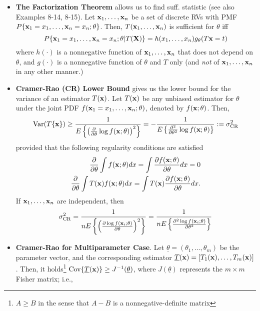 \documentclass[a4paper, oneside]{book}
\begin{document}
\begin{itemize}
\item \textbf{The Factorization Theorem} allows us to find suff. statistic (see also Examples 8-14, 8-15). Let $\mathbf{x}_1,\hdots,\mathbf{x}_n$ be a set of discrete RVs with PMF $P\{\mathbf{x}_1=x_1,\hdots,\mathbf{x}_n=x_n; \theta \}$. Then, $T(\mathbf{x}_1, \hdots, \mathbf{x}_n)$ is sufficient for $\theta$ iff 
\begin{equation}
P\{\mathbf{x}_1=x_1,\hdots,\mathbf{x}_n=x_n; \theta | T(\mathbf{X})\}=h(x_1,\dots,x_n)g_\theta(T\mathbf{x}=t)
\end{equation}	
where $h(\cdot)$ is a nonnegative function of $\mathbf{x}_1, \hdots, \mathbf{x}_n$ that does not depend on $\theta$, and $g(\cdot)$ is a nonnegative function of $\theta$ and $T$ only (and \textit{not} of $\mathbf{x}_1, \hdots, \mathbf{x}_n$ in any other manner.)
\item \textbf{Cramer-Rao (CR) Lower Bound} gives us the lower bound for the variance of an estimator $T(\mathbf{x})$. Let $T(\mathbf{x})$ be any unbiased estimator for $\theta$ under the joint PDF $f(\mathbf{x}_1=x_1,\hdots,\mathbf{x}_n; \theta)$, denoted by $f(\mathbf{x};\theta)$. Then,
\begin{equation}
\text{Var}(T\{\mathbf{x}\}) \ge \frac{1}{E\left\{ \left( \frac{\partial}{\partial \theta}\log f(\mathbf{x}; \theta) \right)^2 \right\}} = -\frac{1}{E\left\{ \frac{\partial^2}{\partial \theta^2}\log f(\mathbf{x}; \theta)  \right\}} := \sigma_{\text{CR}}^2
\end{equation}
provided that the following regularity conditions are satisfied
\begin{align}
\frac{\partial}{\partial \theta} \int f(\mathbf{x}; \theta) dx = \int \frac{\partial f(\mathbf{x};\theta)}{\partial \theta} dx = 0 \\
\frac{\partial}{\partial \theta} \int T(\mathbf{x}) f(\mathbf{x};\theta)dx = \int T(\mathbf{x}) \frac{\partial f(\mathbf{x;\theta})}{\partial \theta} dx.
\end{align}
If $\mathbf{x}_1, \hdots, \mathbf{x}_n$ are independent, then 
\begin{equation}
\sigma_{\text{CR}}^2 = \frac{1}{n E \left\{  \left( \frac{\partial \log f(\mathbf{x}_i; \theta) }{\partial \theta} \right)^2   \right\}    } = \frac{1}{n E \left\{  \frac{\partial^2 \log f(\mathbf{x}_i; \theta) }{\partial \theta^2}    \right\}    }
\end{equation}
\item \textbf{Cramer-Rao for Multiparameter Case}. Let $\underline{\theta} = (\theta_1, \hdots, \theta_m)$ be the parameter vector, and the corresponding estimator $\underline{T}(\mathbf{x})=[T_1(\mathbf{x}), \hdots, T_m(\mathbf{x})]$. Then, it holds\footnote{$A\ge B$ in the sense that $A-B$ is a nonnegative-definite matrix} $\text{Cov}\{\underline{T}(\mathbf{x})\}\ge J^{-1}(\underline{\theta})$, where $J(\underline{\theta})$ represents the $m\times m$ Fisher matrix; i.e., 

\end{itemize}
\end{document}
